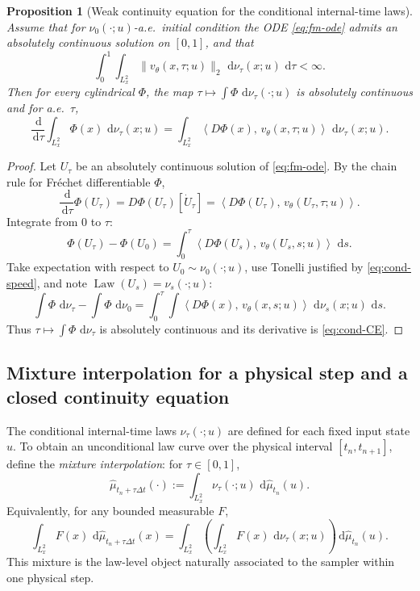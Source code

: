 \documentclass{article}
\numberwithin{equation}{section}
\theoremstyle{plain}
\newtheorem{proposition}[theorem]{Proposition}
\theoremstyle{definition}
\theoremstyle{remark}
\newcommand{\dd}{\,\mathrm{d}}
\DeclareMathOperator{\Law}{Law}
\newcommand{\ip}[2]{\left\langle #1,\,#2 \right\rangle}
\begin{document}
\begin{proposition}[Weak continuity equation for the conditional internal-time laws]
\label{prop:cond-CE}
Assume that for $\nu_0(\cdot;u)$-a.e.\ initial condition the ODE \eqref{eq:fm-ode} admits an absolutely continuous solution
on $[0,1]$, and that
\begin{equation}\label{eq:cond-speed}
\int_0^1\int_{L^2_x}\|v_\theta(x,\tau;u)\|_2\,\dd\nu_\tau(x;u)\,\dd\tau <\infty.
\end{equation}
Then for every cylindrical $\Phi$, the map $\tau\mapsto \int\Phi\,\dd\nu_\tau(\cdot;u)$ is absolutely continuous and for a.e.\ $\tau$,
\begin{equation}\label{eq:cond-CE}
\frac{\dd}{\dd\tau}\int_{L^2_x}\Phi(x)\,\dd\nu_\tau(x;u)
=
\int_{L^2_x}\ip{D\Phi(x)}{v_\theta(x,\tau;u)}\,\dd\nu_\tau(x;u).
\end{equation}
\end{proposition}

\begin{proof}
Let $U_\tau$ be an absolutely continuous solution of \eqref{eq:fm-ode}. By the chain rule for Fr\'echet differentiable $\Phi$,
\[
\frac{\dd}{\dd\tau}\Phi(U_\tau)=D\Phi(U_\tau)[\dot U_\tau]=\ip{D\Phi(U_\tau)}{v_\theta(U_\tau,\tau;u)}.
\]
Integrate from $0$ to $\tau$:
\[
\Phi(U_\tau)-\Phi(U_0)=\int_0^\tau \ip{D\Phi(U_s)}{v_\theta(U_s,s;u)}\,\dd s.
\]
Take expectation with respect to $U_0\sim\nu_0(\cdot;u)$, use Tonelli justified by \eqref{eq:cond-speed}, and note
$\Law(U_s)=\nu_s(\cdot;u)$:
\[
\int\Phi\,\dd\nu_\tau - \int\Phi\,\dd\nu_0
=
\int_0^\tau \int \ip{D\Phi(x)}{v_\theta(x,s;u)}\,\dd\nu_s(x;u)\,\dd s.
\]
Thus $\tau\mapsto \int\Phi\,\dd\nu_\tau$ is absolutely continuous and its derivative is \eqref{eq:cond-CE}.
\end{proof}

\subsection{Mixture interpolation for a physical step and a closed continuity equation}

The conditional internal-time laws $\nu_\tau(\cdot;u)$ are defined for each fixed input state $u$. To obtain an
unconditional law curve over the physical interval $[t_n,t_{n+1}]$, define the \emph{mixture interpolation}:
for $\tau\in[0,1]$,
\begin{equation}\label{eq:mixture}
\widehat\mu_{t_n+\tau\Delta t}(\cdot) := \int_{L^2_x} \nu_\tau(\cdot;u)\,\dd\widehat\mu_{t_n}(u).
\end{equation}
Equivalently, for any bounded measurable $F$,
\[
\int_{L^2_x} F(x)\,\dd\widehat\mu_{t_n+\tau\Delta t}(x)
=
\int_{L^2_x}\left(\int_{L^2_x}F(x)\,\dd\nu_\tau(x;u)\right)\dd\widehat\mu_{t_n}(u).
\]
This mixture is the law-level object naturally associated to the sampler within one physical step.
\end{document}
